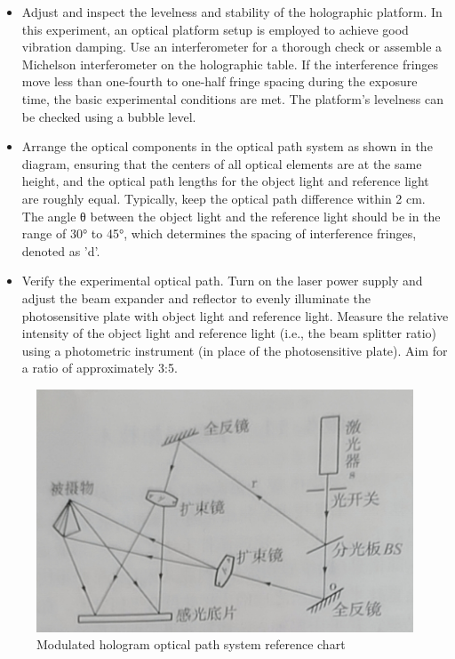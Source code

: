 \documentclass[UTF8]{article}
\begin{document}
    \begin{itemize}
      \item Adjust and inspect the levelness and stability of the holographic platform. In this experiment, an optical platform setup is employed to achieve good vibration damping. Use an interferometer for a thorough check or assemble a Michelson interferometer on the holographic table. If the interference fringes move less than one-fourth to one-half fringe spacing during the exposure time, the basic experimental conditions are met. The platform's levelness can be checked using a bubble level.
    
      \item Arrange the optical components in the optical path system as shown in the diagram, ensuring that the centers of all optical elements are at the same height, and the optical path lengths for the object light and reference light are roughly equal. Typically, keep the optical path difference within 2 cm. The angle θ between the object light and the reference light should be in the range of 30° to 45°, which determines the spacing of interference fringes, denoted as 'd'.
    
      \item Verify the experimental optical path. Turn on the laser power supply and adjust the beam expander and reflector to evenly illuminate the photosensitive plate with object light and reference light. Measure the relative intensity of the object light and reference light (i.e., the beam splitter ratio) using a photometric instrument (in place of the photosensitive plate). Aim for a ratio of approximately 3:5.
    \end{itemize}
    
       	\begin{figure}[H]
           	    	\centering
           	    	\includegraphics[clip,scale=1,trim={0 0 0 0}]{fig/fig6.png}
           	        \caption{Modulated hologram optical path system reference chart }
           	        \label{figure.14}
               \end{figure}
    
\end{document}
